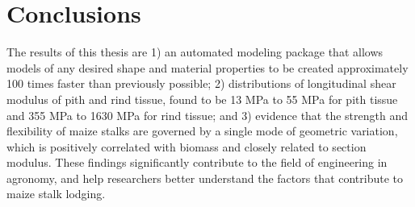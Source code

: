 \section{Conclusions}
\label{sec:conclusions}
The results of this thesis are 1) an automated modeling package that allows models of any desired shape and material properties to be created approximately 100 times faster than previously possible; 2) distributions of longitudinal shear modulus of pith and rind tissue, found to be 13 MPa to 55 MPa for pith tissue and 355 MPa to 1630 MPa for rind tissue; and 3) evidence that the strength and flexibility of maize stalks are governed by a single mode of geometric variation, which is positively correlated with biomass and closely related to section modulus. These findings significantly contribute to the field of engineering in agronomy, and help researchers better understand the factors that contribute to maize stalk lodging.